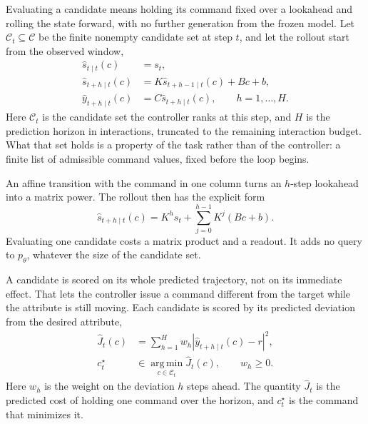 Evaluating a candidate means holding its command fixed over a lookahead and
rolling the state forward, with no further generation from the frozen model.
Let $\mathcal{C}_t\subseteq\mathcal{C}$ be the finite nonempty candidate set
at step $t$, and let the rollout start from the observed window,
\begin{equation}
    \begin{aligned}
        \widehat{s}_{t\mid t}(c)
        &= s_t,\\
        \widehat{s}_{t+h\mid t}(c)
        &=
        K\widehat{s}_{t+h-1\mid t}(c)+Bc+b,\\
        \widehat{y}_{t+h\mid t}(c)
        &=
        C\widehat{s}_{t+h\mid t}(c),
        \qquad h=1,\ldots,H.
    \end{aligned}
    \label{eq:rollout}
\end{equation}
Here $\mathcal{C}_t$ is the candidate set the controller ranks at this step,
and $H$ is the prediction horizon in interactions, truncated to the remaining
interaction budget. What that set holds is a property of the task rather than
of the controller: a finite list of admissible command values, fixed before
the loop begins.

An affine transition with the command in one column turns an $h$-step
lookahead into a matrix power. The rollout then has the explicit form
\begin{equation}
    \widehat{s}_{t+h\mid t}(c)
    =
    K^h s_t
    +
    \sum_{j=0}^{h-1}K^j(Bc+b).
    \label{eq:closed_form_rollout}
\end{equation}
Evaluating one candidate costs a matrix product and a readout. It adds no
query to $p_{\theta}$, whatever the size of the candidate set.

A candidate is scored on its whole predicted trajectory, not on its immediate
effect. That lets the controller issue a command different from the target
while the attribute is still moving. Each candidate is scored by its predicted
deviation from the desired attribute,
\begin{equation}
    \begin{aligned}
        \widehat{J}_t(c)
        &=
        \sum_{h=1}^{H}w_h
        \left|
            \widehat{y}_{t+h\mid t}(c)-r
        \right|^2,\\
        c_t^{\star}
        &\in
        \operatorname*{arg\,min}_{c\in\mathcal{C}_t}
        \widehat{J}_t(c),
        \qquad w_h\geq 0.
    \end{aligned}
    \label{eq:selection}
\end{equation}
Here $w_h$ is the weight on the deviation $h$ steps ahead. The quantity
$\widehat{J}_t$ is the predicted cost of holding one command over the horizon,
and $c_t^{\star}$ is the command that minimizes it.


